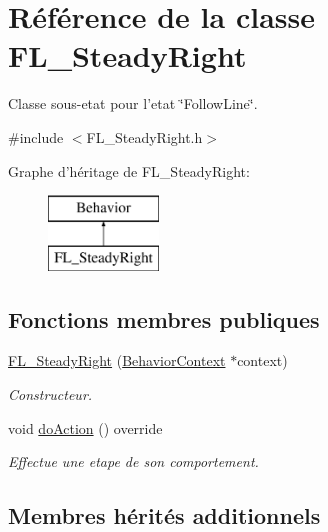 \hypertarget{class_f_l___steady_right}{\section{Référence de la classe F\-L\-\_\-\-Steady\-Right}
\label{class_f_l___steady_right}
}


Classe sous-\/etat pour l'etat \char`\"{}\-Follow\-Line\char`\"{}.  




{\ttfamily \#include $<$F\-L\-\_\-\-Steady\-Right.\-h$>$}

Graphe d'héritage de F\-L\-\_\-\-Steady\-Right\-:\begin{figure}[H]
\begin{center}
\leavevmode
\includegraphics[height=2.000000cm]{class_f_l___steady_right}
\end{center}
\end{figure}
\subsection*{Fonctions membres publiques}
{\bf }\par
\begin{DoxyCompactItemize}
\item 
\hyperlink{class_f_l___steady_right_ab030ddf91a8ff28074b6f7997058354a}{F\-L\-\_\-\-Steady\-Right} (\hyperlink{class_behavior_context}{Behavior\-Context} $\ast$context)
\begin{DoxyCompactList}\small\item\em Constructeur. \end{DoxyCompactList}\item 
void \hyperlink{class_f_l___steady_right_a6d27554021510b8cfdf757d06f8b4e90}{do\-Action} () override
\begin{DoxyCompactList}\small\item\em Effectue une etape de son comportement. \end{DoxyCompactList}\end{DoxyCompactItemize}

\subsection*{Membres hérités additionnels}


